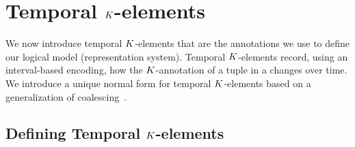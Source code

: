 





\section{Temporal $K$-elements}
\label{sec:temporal-k-normalform}

We now introduce temporal $K$-elements that are the annotations we use to
define our logical model (representation system).  %
Temporal
$K$-elements record, using an interval-based encoding, how the
$K$-annotation of a tuple in a \SKrel{} changes over time. We introduce a
unique normal form for temporal $K$-elements based on a generalization of
coalescing~\cite{DBLP:conf/vldb/BohlenSS96}.

\subsection{Defining Temporal $K$-elements}
\label{sec:concrete-temporal-k}


